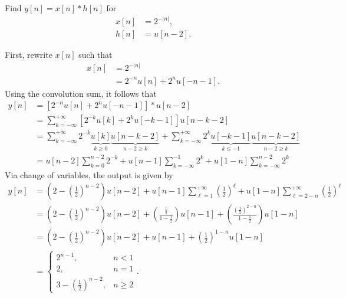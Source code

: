 \documentclass{report}
\begin{document}
\begin{example}
    Find $y[n]=x[n]*h[n]$ for 
    \begin{align*}
        x[n] &= 2^{-|n|}, \\
        h[n] &= u[n-2].
    \end{align*}
\end{example}
\begin{solution}
    First, rewrite $x[n]$ such that
    \begin{align*}
        x[n] &= 2^{-|n|} \\
        &= 2^{-n} u[n] + 2^n u[-n-1].
    \end{align*}
    Using the convolution sum, it follows that 
    \begin{align*}
        y[n] &= [2^{-n} u[n] + 2^n u[-n-1]] * u[n-2] \\
        &= \sum_{k=-\infty}^{+\infty} [2^{-k} u[k] + 2^k u[-k-1]] u[n-k-2] \\
        &= \sum_{k=-\infty}^{+\infty} 2^{-k} \underbrace{u[k]}_\textrm{$k\geq 0$} \underbrace{u[n-k-2]}_\textrm{$n-2\geq k$} + \sum_{k=-\infty}^{+\infty} 2^k \underbrace{u[-k-1]}_\textrm{$k\leq -1$}\underbrace{u[n-k-2]}_\textrm{$n-2\geq k$} \\
        &= u[n-2]\sum_{k=0}^{n-2} 2^{-k} + u[n-1]\sum_{k=-\infty}^{-1} 2^k + u[1-n]\sum_{k=-\infty}^{n-2} 2^k
    \end{align*}
    Via change of variables, the output is given by
    \begin{align*}
        y[n] &= \left(2-\left(\frac{1}{2}\right)^{n-2}\right) u[n-2] + u[n-1]\sum_{\ell=1}^{+\infty} \left(\frac{1}{2}\right)^{\ell} + u[1-n]\sum_{\ell=2-n}^{+\infty} \left(\frac{1}{2}\right)^{\ell} \\
        &= \left(2-\left(\frac{1}{2}\right)^{n-2}\right) u[n-2] + \left(\frac{\frac{1}{2}}{1-\frac{1}{2}}\right)u[n-1] + \left(\frac{\left(\frac{1}{2}\right)^{2-n}}{1-\frac{1}{2}}\right)u[1-n] \\
        &= \left(2-\left(\frac{1}{2}\right)^{n-2}\right) u[n-2] + u[n-1] + \left(\frac{1}{2}\right)^{1-n}u[1-n] \\
        &= \begin{cases} 
            2^{n-1}, & n<1 \\
            2, & n=1 \\
            3-\left(\frac{1}{2}\right)^{n-2}, & n\geq 2
        \end{cases}.
    \end{align*}
\end{solution}
\end{document}
